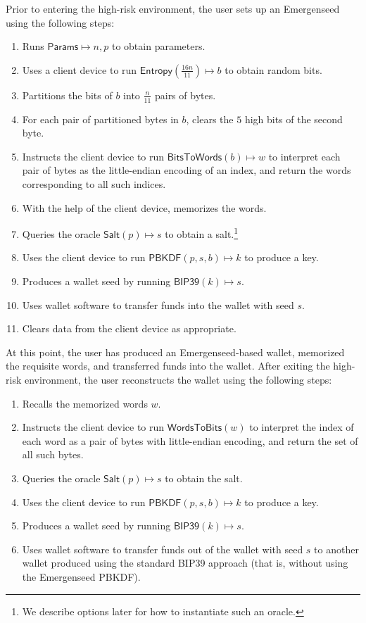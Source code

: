 \documentclass{article}
\begin{document}
Prior to entering the high-risk environment, the user sets up an Emergenseed using the following steps:
\begin{enumerate}
	\item Runs $\mathsf{Params} \mapsto n, p$ to obtain parameters.
	\item Uses a client device to run $\mathsf{Entropy}\left( \frac{16n}{11} \right) \mapsto b$ to obtain random bits.
	\item Partitions the bits of $b$ into $\frac{n}{11}$ pairs of bytes.
	\item For each pair of partitioned bytes in $b$, clears the $5$ high bits of the second byte.
	\item Instructs the client device to run $\mathsf{BitsToWords}(b) \mapsto w$ to interpret each pair of bytes as the little-endian encoding of an index, and return the words corresponding to all such indices.
	\item With the help of the client device, memorizes the words.
	\item Queries the oracle $\mathsf{Salt}(p) \mapsto s$ to obtain a salt.\footnote{We describe options later for how to instantiate such an oracle.}
	\item Uses the client device to run $\mathsf{PBKDF}(p, s, b) \mapsto k$ to produce a key.
	\item Produces a wallet seed by running $\mathsf{BIP39}(k) \mapsto s$.
	\item Uses wallet software to transfer funds into the wallet with seed $s$.
	\item Clears data from the client device as appropriate.
\end{enumerate}

At this point, the user has produced an Emergenseed-based wallet, memorized the requisite words, and transferred funds into the wallet.
After exiting the high-risk environment, the user reconstructs the wallet using the following steps:
\begin{enumerate}
	\item Recalls the memorized words $w$.
	\item Instructs the client device to run $\mathsf{WordsToBits}(w)$ to interpret the index of each word as a pair of bytes with little-endian encoding, and return the set of all such bytes.
	\item Queries the oracle $\mathsf{Salt}(p) \mapsto s$ to obtain the salt.
	\item Uses the client device to run $\mathsf{PBKDF}(p, s, b) \mapsto k$ to produce a key.
	\item Produces a wallet seed by running $\mathsf{BIP39}(k) \mapsto s$.
	\item Uses wallet software to transfer funds out of the wallet with seed $s$ to another wallet produced using the standard BIP39 approach (that is, without using the Emergenseed PBKDF).
\end{enumerate}
\end{document}
